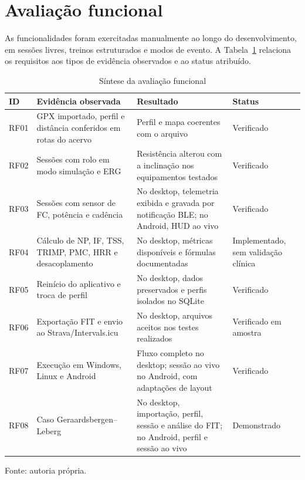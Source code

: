 \section{Avaliação funcional}
\label{sec:avaliacao-funcional}

As funcionalidades foram exercitadas manualmente ao longo do desenvolvimento,
em sessões livres, treinos estruturados e modos de evento. A
Tabela~\ref{tab:avaliacao-funcional} relaciona os requisitos aos tipos de
evidência observados e ao status atribuído.

\begin{table}[htbp]
    \centering
    \caption{Síntese da avaliação funcional}
    \label{tab:avaliacao-funcional}
    \footnotesize
    \renewcommand{\arraystretch}{1.15}
    \setlength{\tabcolsep}{4pt}
    \begin{tabular}{@{}>{\raggedright\arraybackslash}p{1.3cm}
        >{\raggedright\arraybackslash}p{5.3cm}
        >{\raggedright\arraybackslash}p{5.4cm}
        >{\raggedright\arraybackslash}p{2.8cm}@{}}
        \toprule
        \textbf{ID} & \textbf{Evidência observada} &
        \textbf{Resultado} & \textbf{Status} \\
        \midrule
        RF01 & GPX importado, perfil e distância conferidos em rotas do
        acervo & Perfil e mapa coerentes com o arquivo & Verificado \\
        RF02 & Sessões com rolo em modo simulação e ERG & Resistência
        alterou com a inclinação nos equipamentos testados & Verificado \\
        RF03 & Sessões com sensor de FC, potência e cadência & No desktop, telemetria
        exibida e gravada por notificação BLE; no Android, HUD ao vivo &
        Verificado \\
        RF04 & Cálculo de NP, IF, TSS, TRIMP, PMC, HRR e desacoplamento &
        No desktop, métricas disponíveis e fórmulas documentadas &
        Implementado, sem validação clínica \\
        RF05 & Reinício do aplicativo e troca de perfil & No desktop, dados
        preservados e perfis isolados no SQLite & Verificado \\
        RF06 & Exportação FIT e envio ao Strava/Intervals.icu & No desktop,
        arquivos aceitos nos testes realizados & Verificado em amostra \\
        RF07 & Execução em Windows, Linux e Android & Fluxo completo no
        desktop; sessão ao vivo no Android, com adaptações de layout &
        Verificado \\
        RF08 & Caso Geraardsbergen--Leberg & No desktop, importação, perfil,
        sessão e análise do FIT; no Android, perfil e sessão ao vivo &
        Demonstrado \\
        \bottomrule
    \end{tabular}
    \vspace{0.2cm}
    \par\small Fonte: autoria própria.
\end{table}

